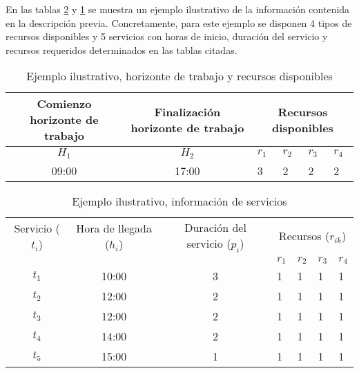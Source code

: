 En las tablas \ref{ejemploilustrativo-servicios} y \ref{ejemploilustrativo-turno-recursos} se muestra un ejemplo ilustrativo de la información contenida en la descripción previa. Concretamente, para este ejemplo se disponen 4 tipos de recursos disponibles y 5 servicios con horas de inicio, duración del servicio y recursos requeridos determinados en las tablas citadas. 


\begin{table}
    \centering
    \begin{tabular}{cc p{1.5em} p{1.5em} p{1.5em} p{1.5em}}
        \toprule
        {Comienzo horizonte de trabajo} & {Finalización horizonte de trabajo} & \multicolumn{4}{c}{Recursos disponibles}\\
        \hline
        $H_1$ & $H_2$ & $r_1$ & $r_2$ & $r_3$ & $r_4$ \\
        \hline
        09:00 & 17:00 & 3 & 2  & 2 & 2 \\
        \bottomrule
    \end{tabular}
    \caption{Ejemplo ilustrativo, horizonte de trabajo y recursos disponibles}
    \label{ejemploilustrativo-turno-recursos}
\end{table}

\begin{table}
    \centering
\begin{tabular}{c|c|c|p{1.25em}p{1.25em}p{1.25em}p{1.25em}}
    \toprule
    Servicio ($t_i$)& Hora de llegada ($h_i$) & Duración del servicio ($p_i$) & \multicolumn{4}{c}{Recursos ($r_{ik}$)} \\
                    &                       &                            & $r_{1}$ & $r_{2}$ & $r_{3}$ & $r_{4}$  \\
    \hline
    $t_1$ & 10:00 & 3    &   1  & 1     & 1     & 1    \\
    \cline{1-7}
    $t_2$ & 12:00 & 2    &   1  & 1     & 1     & 1    \\
    \cline{1-7}
    $t_3$ & 12:00 & 2    &   1  & 1     & 1     & 1    \\
    \cline{1-7}
    $t_4$ & 14:00 & 2   &    1  & 1     & 1     & 1    \\
    \cline{1-7}
    $t_5$ & 15:00 & 1    &   1  & 1     & 1     & 1    \\
    \bottomrule
\end{tabular}
    \caption{Ejemplo ilustrativo, información de servicios}
\label{ejemploilustrativo-servicios}
\end{table}

